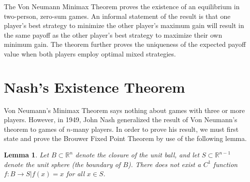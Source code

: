 \documentclass[12pt]{article}
\newtheorem{lemma}[theorem]{Lemma}
\theoremstyle{definition}
\theoremstyle{remark}
\begin{document}
The Von Neumann Minimax Theorem proves the existence of an equilibrium in two-person, zero-sum games. An informal statement of the result is that one player's best strategy to minimize the other player's maximum gain will result in the same payoff as the other player's best strategy to maximize their own
minimum gain. The theorem further proves the uniqueness of the expected payoff value when both players employ optimal mixed strategies.



\section{Nash's Existence Theorem}
Von Neumann's Minimax Theorem says nothing about games with three or more players. However, in 1949, John Nash generalized the result of Von Neumann's theorem to games of $n$-many players. In order to prove his result, we must first state and prove the Brouwer Fixed Point Theorem by use of the following lemma.

\begin{lemma}
Let $B \subset \mathbb{R}^n$ denote the closure of the unit ball, and let $S \subset \mathbb{R}^{n-1}$ denote the unit sphere (the boundary of $B$). There does not exist a $C^1$ function $f: B \rightarrow S | f(x) = x$ for all $x \in S$.
\end{lemma}
\end{document}
